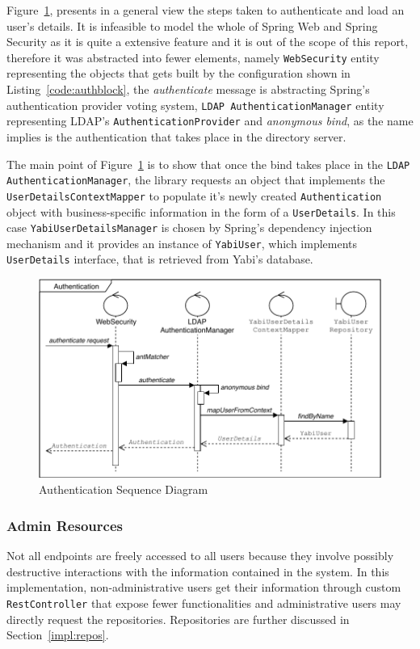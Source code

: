 Figure~\ref{fig:authseq}, presents in a general view the steps taken to authenticate and load an user's details. It is infeasible to model the whole of Spring Web and Spring Security as it is quite a extensive feature and it is out of the scope of this report, therefore it was abstracted into fewer elements, namely \texttt{WebSecurity} entity representing the objects that gets built by the configuration shown in Listing~\ref{code:authblock}, the \textit{authenticate} message is abstracting Spring's authentication provider voting system, \texttt{LDAP AuthenticationManager} entity representing \gls{LDAP}'s \texttt{AuthenticationProvider} and \textit{anonymous bind}, as the name implies is the authentication that takes place in the directory server.

The main point of Figure~\ref{fig:authseq} is to show that once the bind takes place in the \texttt{LDAP AuthenticationManager}, the library requests an object that implements the \texttt{UserDetailsContextMapper} to populate it's newly created \texttt{Authentication} object with business-specific information in the form of a \texttt{UserDetails}. In this case \texttt{YabiUserDetailsManager} is chosen by Spring's dependency injection mechanism and it provides an instance of \texttt{YabiUser}, which implements \texttt{UserDetails} interface, that is retrieved from \gls{Yabi}'s database.

\begin{figure}
  \centering
  \includegraphics[width=.9\textwidth]{images/diagramas/authentication}
  \caption{Authentication Sequence Diagram}\label{fig:authseq}
\end{figure}


\subsubsection{Admin Resources}\label{impl:admres}
Not all endpoints are freely accessed to all users because they involve possibly destructive interactions with the information contained in the system. In this implementation, non-administrative users get their information through custom \texttt{RestController} that expose fewer functionalities and administrative users may directly request the repositories. Repositories are further discussed in Section~\ref{impl:repos}.

